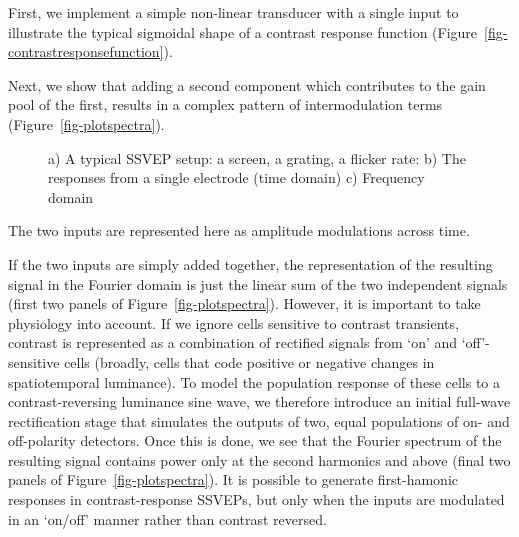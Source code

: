 \documentclass[
  letterpaper,
  DIV=11,
  numbers=noendperiod]{scrartcl}
\begin{document}
First, we implement a simple non-linear transducer with a single input
to illustrate the typical sigmoidal shape of a contrast response
function (Figure~\ref{fig-contrastresponsefunction}).

Next, we show that adding a second component which contributes to the
gain pool of the first, results in a complex pattern of intermodulation
terms (Figure~\ref{fig-plotspectra}).

\begin{figure}


\caption{\label{fig-plotsinewaves}a) A typical SSVEP setup: a screen, a
grating, a flicker rate: b) The responses from a single electrode (time
domain) c) Frequency domain}

\end{figure}%

The two inputs are represented here as amplitude modulations across
time.

If the two inputs are simply added together, the representation of the
resulting signal in the Fourier domain is just the linear sum of the two
independent signals (first two panels of Figure~\ref{fig-plotspectra}).
However, it is important to take physiology into account. If we ignore
cells sensitive to contrast transients, contrast is represented as a
combination of rectified signals from `on' and `off'-sensitive cells
(broadly, cells that code positive or negative changes in spatiotemporal
luminance). To model the population response of these cells to a
contrast-reversing luminance sine wave, we therefore introduce an
initial full-wave rectification stage that simulates the outputs of two,
equal populations of on- and off-polarity detectors. Once this is done,
we see that the Fourier spectrum of the resulting signal contains power
only at the second harmonics and above (final two panels of
Figure~\ref{fig-plotspectra}). It is possible to generate first-hamonic
responses in contrast-response SSVEPs, but only when the inputs are
modulated in an `on/off' manner rather than contrast reversed.
\end{document}
